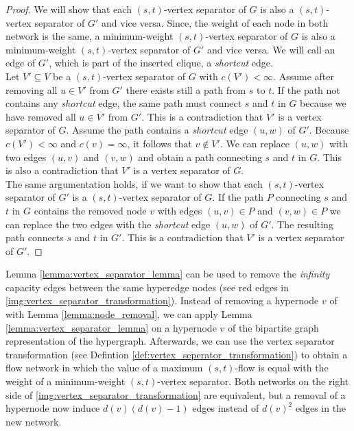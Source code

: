 \begin{proof}
We will show that each $(s,t)$-vertex separator of $G$ is also a $(s,t)$-vertex separator
of $G'$ and vice versa. Since, the weight of each node in both network is the same, a minimum-weight
$(s,t)$-vertex separator of $G$ is also a minimum-weight $(s,t)$-vertex separator of $G'$ and vice versa.
We will call an edge of $G'$, which is part of the inserted clique, a \emph{shortcut} edge.\\
Let $V' \subseteq V$ be a $(s,t)$-vertex separator of $G$ with $c(V') < \infty$. Assume after removing
all $u \in V'$ from $G'$ there exists still a path from $s$ to $t$. If the path not contains any
\emph{shortcut} edge, the same path must connect $s$ and $t$ in $G$ because we have removed all $u \in V'$
from $G'$. This is a contradiction that $V'$ is a vertex separator of $G$. Assume the path contains
a \emph{shortcut} edge $(u,w)$ of $G'$.  Because $c(V') < \infty$ and $c(v) = \infty$,
it follows that $v \notin V'$. We can replace $(u,w)$ with two edges $(u,v)$ and $(v,w)$
and obtain a path connecting $s$ and $t$ in $G$. This is also a contradiction that $V'$ is a vertex
separator of $G$.\\
The same argumentation holds, if we want to show that each $(s,t)$-vertex separator of $G'$
is a $(s,t)$-vertex separator of $G$. If the path $P$ connecting $s$ and $t$ in $G$ contains
the removed node $v$ with edges $(u,v) \in P$ and $(v,w) \in P$ we can replace the two edges
with the \emph{shortcut} edge $(u,w)$ of $G'$. The resulting path connects $s$ and $t$ in $G'$.
This is a contradiction that $V'$ is a vertex separator of $G'$.
\end{proof}

Lemma \ref{lemma:vertex_separator_lemma} can be used to remove the \emph{infinity} capacity
edges between the same hyperedge nodes (see red edges in \autoref{img:vertex_separator_transformation}).
Instead of removing a hypernode $v$ of  with Lemma \ref{lemma:node_removal}, we can apply
Lemma \ref{lemma:vertex_separator_lemma} on a hypernode $v$ of the bipartite graph representation
of the hypergraph. Afterwards, we can use the vertex separator transformation (see Defintion \ref{def:vertex_seperator_transformation})
to obtain a flow network in which the value of a maximum $(s,t)$-flow is equal with the
weight of a minimum-weight $(s,t)$-vertex separator. Both networks on the right side of 
\autoref{img:vertex_separator_transformation} are equivalent, but a removal of a hypernode
now induce $d(v)(d(v) - 1)$ edges instead of $d(v)^2$ edges in the new network.


